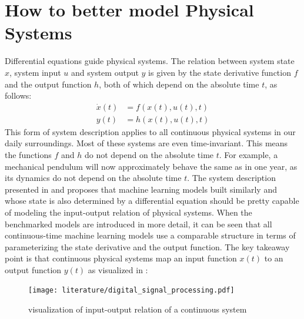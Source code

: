 \documentclass[draft,final]{vutinfth} %
\begin{document}
    \section{How to better model Physical Systems} \label{physical_systems}
    Differential equations guide physical systems. The relation between system state $x$, system input $u$ and system output $y$ is given by the state derivative function $f$ and the output function $h$, both of which depend on the absolute time $t$, as follows:
    \begin{align}
        \label{physical_system_equations_state}
        \dot x(t) &= f(x(t),u(t),t) \\
        \label{physical_system_equations_output}
        y(t) &= h(x(t),u(t),t)
    \end{align}
    This form of system description applies to all continuous physical systems in our daily surroundings. Most of these systems are even time-invariant.
    This means the functions $f$ and $h$ do not depend on the absolute time $t$.
    For example, a mechanical pendulum will now approximately behave the same as in one year, as its dynamics do not depend on the absolute time $t$.
    The system description presented in  and  proposes that machine learning models built similarly and whose state is also determined by a differential equation should be pretty capable of modeling the input-output relation of physical systems.
    When the benchmarked models are introduced in more detail, it can be seen that all continuous-time machine learning models use a comparable structure in terms of parameterizing the state derivative and the output function.
    The key takeaway point is that continuous physical systems map an input function $x(t)$ to an output function $y(t)$ as visualized in \cite[p. 102]{dsp}:
    \begin{figure}[H]
        \centering{}
        \texttt{[image: literature/digital\_signal\_processing.pdf]}
        \caption{visualization of input-output relation of a continuous system}
        \label{fig:continuous_system_vis}
    \end{figure}
\end{document}

